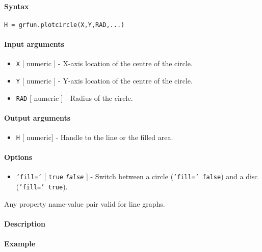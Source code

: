 


	\paragraph{Syntax}

\begin{verbatim}
H = grfun.plotcircle(X,Y,RAD,...)
\end{verbatim}

\paragraph{Input arguments}

\begin{itemize}
\item
  \texttt{X} {[} numeric {]} - X-axis location of the centre of the
  circle.
\item
  \texttt{Y} {[} numeric {]} - Y-axis location of the centre of the
  circle.
\item
  \texttt{RAD} {[} numeric {]} - Radius of the circle.
\end{itemize}

\paragraph{Output arguments}

\begin{itemize}
\itemsep1pt\parskip0pt
\item
  \texttt{H} {[} numeric{]} - Handle to the line or the filled area.
\end{itemize}

\paragraph{Options}

\begin{itemize}
\itemsep1pt\parskip0pt
\item
  \texttt{'fill='} {[} \texttt{true} \textbar{} \emph{\texttt{false}}
  {]} - Switch between a circle (\texttt{'fill=' false}) and a disc
  (\texttt{'fill=' true}).
\end{itemize}

Any property name-value pair valid for line graphs.

\paragraph{Description}

\paragraph{Example}


